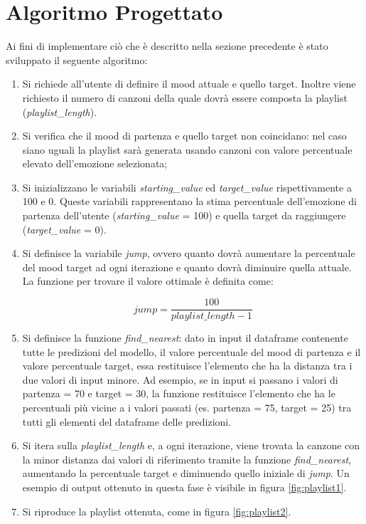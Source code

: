 \documentclass[11pt]{report}
\begin{document}
\section{Algoritmo Progettato}

Ai fini di implementare ciò che è descritto nella sezione precedente è stato sviluppato il seguente algoritmo:
\begin{enumerate}

    \item Si richiede all'utente di definire il mood attuale e quello target. Inoltre viene richiesto il numero di canzoni della quale dovrà essere composta la playlist (\textit{playlist\_length}).

    \item Si verifica che il mood di partenza e quello target non coincidano: nel caso siano uguali la playlist sarà generata usando canzoni con valore percentuale elevato dell'emozione selezionata;
    
    \item Si inizializzano le variabili \textit{starting\_value} ed \textit{target\_value} rispettivamente a 100 e 0. Queste variabili rappresentano la stima percentuale dell'emozione di partenza dell'utente (\textit{starting\_value} = 100) e quella target da raggiungere (\textit{target\_value} = 0).
    
    \item Si definisce la variabile \textit{jump}, ovvero quanto dovrà aumentare la percentuale del mood target ad ogni iterazione e quanto dovrà diminuire quella attuale. La funzione per trovare il valore ottimale è definita come:
    
    \begin{equation}
jump = \frac{100}{playlist\_length - 1}
    \end{equation}
    
    
    
    \item Si definisce la funzione \textit{find\_nearest}: dato in input il dataframe contenente tutte le predizioni del modello, il valore percentuale del mood di partenza e il valore percentuale target, essa restituisce l'elemento che ha la distanza tra i due valori di input minore. Ad esempio, se in input si passano i valori di partenza = 70 e target = 30, la funzione restituisce l'elemento che ha le percentuali più vicine a i valori passati (es. partenza = 75, target = 25) tra tutti gli elementi del dataframe delle predizioni. 
    
    \item Si itera sulla \textit{playlist\_length} e, a ogni iterazione, viene trovata la canzone con la minor distanza dai valori di riferimento tramite la funzione \textit{find\_nearest}, aumentando la percentuale target e diminuendo quello iniziale di \textit{jump}. Un esempio di output ottenuto in questa fase è visibile in figura \ref{fig:playlist1}.
    
    \item Si riproduce la playlist ottenuta, come in figura \ref{fig:playlist2}.
\end{enumerate}
\end{document}
